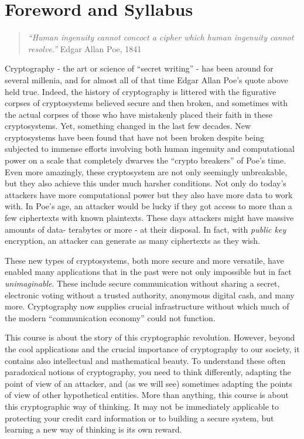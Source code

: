 \chapter{Foreword and Syllabus}\label{Foreword-and-Syllabus}

\begin{quote}
\emph{``Human ingenuity cannot concoct a cipher which human ingenuity
cannot resolve.''} Edgar Allan Poe, 1841
\end{quote}

Cryptography - the art or science of ``secret writing'' - has been
around for several millenia, and for almost all of that time Edgar Allan
Poe's quote above held true. Indeed, the history of cryptography is
littered with the figurative corpses of cryptosystems believed secure
and then broken, and sometimes with the actual corpses of those who have
mistakenly placed their faith in these cryptosystems. Yet, something
changed in the last few decades. New cryptosystems have been found that
have not been broken despite being subjected to immense efforts
involving both human ingenuity and computational power on a scale that
completely dwarves the ``crypto breakers'' of Poe's time. Even more
amazingly, these cryptosystem are not only seemingly unbreakable, but
they also achieve this under much harsher conditions. Not only do
today's attackers have more computational power but they also have more
data to work with. In Poe's age, an attacker would be lucky if they got
access to more than a few ciphertexts with known plaintexts. These days
attackers might have massive amounts of data- terabytes or more - at
their disposal. In fact, with \emph{public key} encryption, an attacker
can generate as many ciphertexts as they wish.

These new types of cryptosystems, both more secure and more versatile,
have enabled many applications that in the past were not only impossible
but in fact \emph{unimaginable}. These include secure communication
without sharing a secret, electronic voting without a trusted authority,
anonymous digital cash, and many more. Cryptography now supplies crucial
infrastructure without which much of the modern ``communication
economy'' could not function.

This course is about the story of this cryptographic revolution.
However, beyond the cool applications and the crucial importance of
cryptography to our society, it contains also intellectual and
mathematical beauty. To understand these often paradoxical notions of
cryptography, you need to think differently, adapting the point of view
of an attacker, and (as we will see) sometimes adapting the points of
view of other hypothetical entities. More than anything, this course is
about this cryptographic way of thinking. It may not be immediately
applicable to protecting your credit card information or to building a
secure system, but learning a new way of thinking is its own reward.

